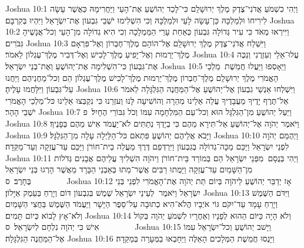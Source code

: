 Joshua 10:1	וַיְהִי כִשְׁמֹעַ אֲדֹנִי־צֶדֶק מֶלֶךְ יְרוּשָׁלַ͏ִם כִּי־לָכַד יְהוֹשֻׁעַ אֶת־הָעַי וַיַּחֲרִימָהּ כַּאֲשֶׁר עָשָׂה לִירִיחוֹ וּלְמַלְכָּהּ כֵּן־עָשָׂה לָעַי וּלְמַלְכָּהּ וְכִי הִשְׁלִימוּ יֹשְׁבֵי גִבְעוֹן אֶת־יִשְׂרָאֵל וַיִּהְיוּ בְּקִרְבָּם׃
Joshua 10:2	וַיִּירְאוּ מְאֹד כִּי עִיר גְּדוֹלָה גִּבְעוֹן כְּאַחַת עָרֵי הַמַּמְלָכָה וְכִי הִיא גְדוֹלָה מִן־הָעַי וְכל־אֲנָשֶׁיהָ גִּבֹּרִים׃
Joshua 10:3	וַיִּשְׁלַח אֲדֹנִי־צֶדֶק מֶלֶךְ יְרוּשָׁלַ͏ִם אֶל־הוֹהָם מֶלֶךְ־חֶבְרוֹן וְאֶל־פִּרְאָם מֶלֶךְ־יַרְמוּת וְאֶל־יָפִיעַ מֶלֶךְ־לָכִישׁ וְאֶל־דְּבִיר מֶלֶךְ־עֶגְלוֹן לֵאמֹר׃
Joshua 10:4	עֲלוּ־אֵלַי וְעִזְרֻנִי וְנַכֶּה אֶת־גִּבְעוֹן כִּי־הִשְׁלִימָה אֶת־יְהוֹשֻׁעַ וְאֶת־בְּנֵי יִשְׂרָאֵל׃
Joshua 10:5	וַיֵּאָסְפוּ וַיַּעֲלוּ חֲמֵשֶׁת  מַלְכֵי הָאֱמֹרִי מֶלֶךְ יְרוּשָׁלַ͏ִם מֶלֶךְ־חֶבְרוֹן מֶלֶךְ־יַרְמוּת מֶלֶךְ־לָכִישׁ מֶלֶךְ־עֶגְלוֹן הֵם וְכל־מַחֲנֵיהֶם וַיַּחֲנוּ עַל־גִּבְעוֹן וַיִּלָּחֲמוּ עָלֶיהָ׃
Joshua 10:6	וַיִּשְׁלְחוּ אַנְשֵׁי גִבְעוֹן אֶל־יְהוֹשֻׁעַ אֶל־הַמַּחֲנֶה הַגִּלְגָּלָה לֵאמֹר אַל־תֶּרֶף יָדֶיךָ מֵעֲבָדֶיךָ עֲלֵה אֵלֵינוּ מְהֵרָה וְהוֹשִׁיעָה לָּנוּ וְעזְרֵנוּ כִּי נִקְבְּצוּ אֵלֵינוּ כּל־מַלְכֵי הָאֱמֹרִי יֹשְׁבֵי הָהָר׃
Joshua 10:7	וַיַּעַל יְהוֹשֻׁעַ מִן־הַגִּלְגָּל הוּא וְכל־עַם הַמִּלְחָמָה עִמּוֹ וְכֹל גִּבּוֹרֵי הֶחָיִל׃ {פ}
Joshua 10:8	וַיֹּאמֶר יְהֹוָה אֶל־יְהוֹשֻׁעַ אַל־תִּירָא מֵהֶם כִּי בְיָדְךָ נְתַתִּים לֹא־יַעֲמֹד אִישׁ מֵהֶם בְּפָנֶיךָ׃
Joshua 10:9	וַיָּבֹא אֲלֵיהֶם יְהוֹשֻׁעַ פִּתְאֹם כּל־הַלַּיְלָה עָלָה מִן־הַגִּלְגָּל׃
Joshua 10:10	וַיְהֻמֵּם יְהֹוָה לִפְנֵי יִשְׂרָאֵל וַיַּכֵּם מַכָּה־גְדוֹלָה בְּגִבְעוֹן וַיִּרְדְּפֵם דֶּרֶךְ מַעֲלֵה בֵית־חוֹרֹן וַיַּכֵּם עַד־עֲזֵקָה וְעַד־מַקֵּדָה׃
Joshua 10:11	וַיְהִי בְּנֻסָם  מִפְּנֵי יִשְׂרָאֵל הֵם בְּמוֹרַד בֵּית־חוֹרֹן וַיהֹוָה הִשְׁלִיךְ עֲלֵיהֶם אֲבָנִים גְּדֹלוֹת מִן־הַשָּׁמַיִם עַד־עֲזֵקָה וַיָּמֻתוּ רַבִּים אֲשֶׁר־מֵתוּ בְּאַבְנֵי הַבָּרָד מֵאֲשֶׁר הָרְגוּ בְּנֵי יִשְׂרָאֵל בֶּחָרֶב׃ {ס}        
Joshua 10:12	אָז יְדַבֵּר יְהוֹשֻׁעַ לַיהֹוָה בְּיוֹם תֵּת יְהֹוָה אֶת־הָאֱמֹרִי לִפְנֵי בְּנֵי יִשְׂרָאֵל וַיֹּאמֶר  לְעֵינֵי יִשְׂרָאֵל שֶׁמֶשׁ בְּגִבְעוֹן דּוֹם וְיָרֵחַ בְּעֵמֶק אַיָּלוֹן׃
Joshua 10:13	וַיִּדֹּם הַשֶּׁמֶשׁ וְיָרֵחַ עָמָד עַד־יִקֹּם גּוֹי אֹיְבָיו הֲלֹא־הִיא כְתוּבָה עַל־סֵפֶר הַיָּשָׁר וַיַּעֲמֹד הַשֶּׁמֶשׁ בַּחֲצִי הַשָּׁמַיִם וְלֹא־אָץ לָבוֹא כְּיוֹם תָּמִים׃
Joshua 10:14	וְלֹא הָיָה כַּיּוֹם הַהוּא לְפָנָיו וְאַחֲרָיו לִשְׁמֹעַ יְהֹוָה בְּקוֹל אִישׁ כִּי יְהֹוָה נִלְחָם לְיִשְׂרָאֵל׃ {ס}        
Joshua 10:15	וַיָּשׁב יְהוֹשֻׁעַ וְכל־יִשְׂרָאֵל עִמּוֹ אֶל־הַמַּחֲנֶה הַגִּלְגָּלָה׃
Joshua 10:16	וַיָּנֻסוּ חֲמֵשֶׁת הַמְּלָכִים הָאֵלֶּה וַיֵּחָבְאוּ בַמְּעָרָה בְּמַקֵּדָה׃
